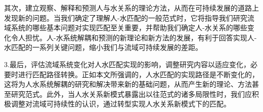 其次，建立观察、解释和预测人与水关系的理论方法，从而在可持续发展的道路上发现新的问题。当我们确定了理解人-水匹配的一般范式时，它将指导我们研究流域系统的哪些基本问题对实现匹配至关重要，并帮助我们确定人-水关系的哪些变化令人担忧。人-水系统解耦和预测的新理论和新方法的发展，有利于回答实现人-水匹配的一系列关键问题，缩小我们与流域可持续发展的差距。

3.最后，评估流域系统变化对人水匹配实现的影响，调整研究内容以适应变化，必要时进行匹配路径转换。正如本文所强调的，人水匹配的实现路径是不断变化的，这将为人水系统解耦的研究和解决带来新的基础问题，从而产生新的理论、方法甚至研究范式。此外，当人水关系新模式暴露出以往范式的诸多局限性时，我们应积极调整对流域可持续性的认识，通过转型实现人水关系新模式下的匹配。
